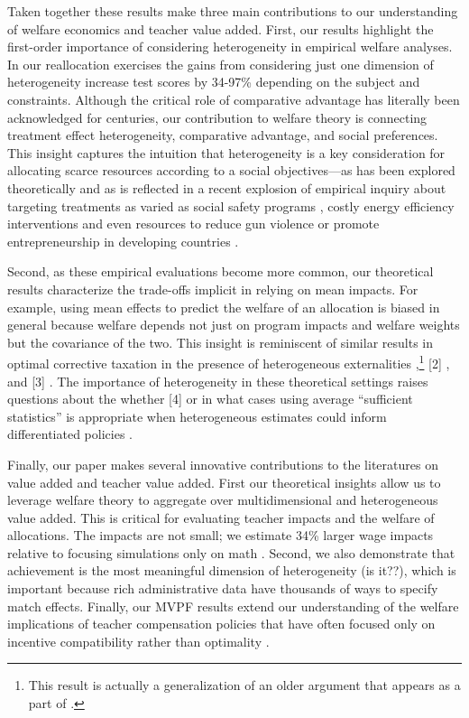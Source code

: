 \documentclass[12pt]{article}
\theoremstyle{definition}
\theoremstyle{definition}
\theoremstyle{definition}
\theoremstyle{definition}
\begin{document}
Taken together these results make three main contributions to our understanding of welfare economics and teacher value added. First, our results highlight the first-order importance of considering heterogeneity in empirical welfare analyses. In our reallocation exercises the gains from considering just one dimension of heterogeneity increase test scores by 34-97\% depending on the subject and constraints. Although the critical role of comparative advantage has literally been acknowledged for centuries, our contribution to welfare theory is connecting treatment effect heterogeneity, comparative advantage, and social preferences. This insight captures the intuition that heterogeneity is a key consideration for allocating scarce resources according to a social objectives---as has been explored theoretically \citep{kitagawa2018should,athey2021policy} and as is reflected in a recent explosion of empirical inquiry about targeting treatments as varied as social safety programs \citep{alatas2016self,finkelstein2019take},  costly energy efficiency interventions \citep{ito2021selection,ida2022choosing} and even resources to reduce gun violence \citep{bhatt2023predicting} or promote entrepreneurship in developing countries \citep{hussam2022targeting}.

Second, as these empirical evaluations become more common, our theoretical results characterize the trade-offs implicit in relying on mean impacts. For example, using mean effects to predict the welfare of an allocation is biased in general because welfare depends not just on program impacts and welfare weights but the covariance of the two. This insight is reminiscent of similar results in optimal corrective taxation in the presence of heterogeneous externalities \citep[see][]{griffith2019tax},\footnote{This result is actually a generalization of an older argument that appears as a part of \citet{diamond1973consumption}.} [2] , and [3] . The importance of heterogeneity in these theoretical settings raises questions about the whether [4] \citep{}  or in what cases using average ``sufficient statistics'' is appropriate when heterogeneous estimates could inform differentiated policies \citep[such as location-specific corrective taxation, as suggested by results from][]{hollingsworth2019external,fell2021emissions,sexton2021heterogeneous}.

Finally, our paper makes several innovative contributions to the literatures on value added and teacher value added. First our theoretical insights allow us to leverage welfare theory to aggregate over multidimensional and heterogeneous value added. This is critical for evaluating teacher impacts and the welfare of allocations. The impacts are not small; we estimate 34\% larger wage impacts relative to focusing simulations only on math \citep[as in][]{chetty2014measuring1,Delgado2020,bates2022teacher}. Second, we also demonstrate that achievement is the most meaningful dimension of heterogeneity (is it??), which is important because rich administrative data have thousands of ways to specify match effects. Finally, our MVPF results extend our understanding of the welfare implications of teacher compensation policies that have often focused only on incentive compatibility rather than optimality \citep[e.g.,][]{rothstein2015teacher,bates2022teacher}.
\end{document}

